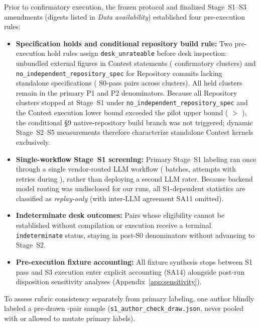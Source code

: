 \documentclass[11pt]{article}
\begin{document}
Prior to confirmatory execution, the frozen protocol and finalized Stage~S1--S3 amendments (digests listed in \emph{Data availability}) established four pre-execution rules:
\begin{itemize}
\item \textbf{Specification holds and conditional repository build rule:} Two pre-execution hold rules assign \texttt{desk\_unrateable} before desk inspection: unbundled external figures in Contest statements (\BenchContestUnbundledConfN{} confirmatory clusters) and \texttt{no\_independent\_repository\_spec} for Repository commits lacking standalone specifications (\BenchRepoDeskUnratN{} S0-pass pairs across \BenchConfRepoClustersN{} clusters). All \BenchHeldUnratConfClustN{} held clusters remain in the primary P1 and P2 denominators. Because all \BenchConfRepoClustersN{} Repository clusters stopped at Stage~S1 under \texttt{no\_independent\_repository\_spec} and the Contest execution lower bound exceeded the pilot upper bound (\BenchContestExecLo{} $>$ \BenchPilotExecUpperPct{}), the conditional \S9 native-repository build branch was not triggered; dynamic Stage~S2--S5 measurements therefore characterize standalone Contest kernels exclusively.
\item \textbf{Single-workflow Stage~S1 screening:} Primary Stage~S1 labeling ran once through a single vendor-routed LLM workflow (\BenchSOneBatchesN{} batches, \BenchSOneAttemptsN{} attempts with \BenchSOneRetriesN{} retries during \BenchSOneDateWindow{}), rather than deploying a second LLM rater. Because backend model routing was undisclosed for our runs, all S1-dependent statistics are classified as \emph{replay-only} (with inter-LLM agreement SA11 omitted).
\item \textbf{Indeterminate desk outcomes:} Pairs whose eligibility cannot be established without compilation or execution receive a terminal \texttt{indeterminate} status, staying in post-S0 denominators without advancing to Stage~S2.
\item \textbf{Pre-execution fixture accounting:} All fixture synthesis stops between S1 pass and S3 execution enter explicit accounting (SA14) alongside post-run disposition sensitivity analyses (Appendix~\ref{app:sensitivity}).
\end{itemize}

To assess rubric consistency separately from primary labeling, one author blindly labeled a pre-drawn \BenchAuthorSample{}-pair sample (\texttt{s1\_author\_check\_draw.json}, never pooled with or allowed to mutate primary labels).
\end{document}
